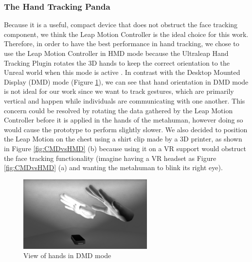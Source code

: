 \subsubsection{The Hand Tracking Panda}
Because it is a useful, compact device that does not obstruct the face tracking component, we think the Leap Motion Controller is the ideal choice for this work. Therefore, in order to have the best performance in hand tracking, we chose to use the Leap Motion Controller in HMD mode because the Ultraleap Hand Tracking Plugin rotates the 3D hands to keep the correct orientation to the Unreal world when this mode is active \cite{ULTP}. In contrast with the Desktop Mounted Display (DMD) mode (Figure \ref{fig:DMD}), we can see that hand orientation in DMD mode is not ideal for our work since we want to track gestures, which are primarily vertical and happen while individuals are communicating with one another. This concern could be resolved by rotating the data gathered by the Leap Motion Controller before it is applied in the hands of the metahuman, however doing so would cause the prototype to perform slightly slower. We also decided to position the Leap Motion on the chest using a shirt clip made by a 3D printer, as shown in Figure \ref{fig:CMDvsHMD} (b) because using it on a VR support would obstruct the face tracking functionality (imagine having a VR headset as Figure \ref{fig:CMDvsHMD} (a) and wanting the metahuman to blink its right eye).

\begin{figure}[!htb]
\includegraphics[width=0.6\textwidth]{figures/LeapView.jpg}
\centering
\caption{View of hands in DMD mode}
\label{fig:DMD}
\end{figure}

